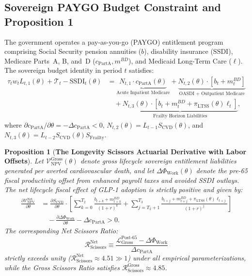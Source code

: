 \documentclass[11pt,a4paper]{article}
\newtheorem{proposition}{Proposition}
\begin{document}
\subsection{Sovereign PAYGO Budget Constraint and Proposition 1}
The government operates a pay-as-you-go (PAYGO) entitlement program comprising Social Security pension annuities ($b$), disability insurance ($\text{SSDI}$), Medicare Parts~A, B, and~D ($c_{\text{PartA}}, m^{BD}$), and Medicaid Long-Term Care ($\ell$). The sovereign budget identity in period $t$ satisfies:
\begin{equation}
\begin{aligned}
    \tau_t w_t L_{t, 1}(\theta) + \mathcal{T}_t - \text{SSDI}_t(\theta) &= \underbrace{N_{t, 1} \cdot c_{\text{PartA}}(\theta)}_{\text{Acute Inpatient Medicare}} + \underbrace{N_{t, 2}(\theta) \cdot \left[ b_t + m_t^{BD} \right]}_{\text{OASDI + Outpatient Medicare}} \\
    &\quad + \underbrace{N_{t, 3}(\theta) \cdot \left[ b_t + m_t^{BD} + \pi_{\text{LTSS}}(\theta)\ell_t \right]}_{\text{Frailty Horizon Liabilities}},
\end{aligned}
\end{equation}
where $\partial c_{\text{PartA}}/\partial \theta = -\Delta c_{\text{PartA}} < 0$, $N_{t, 2}(\theta) = L_{t-1} S_{\text{CVD}}(\theta)$, and $N_{t, 3}(\theta) = L_{t-2} S_{\text{CVD}}(\theta) S_{\text{Frailty}}$.

\begin{proposition}[\textbf{The Longevity Scissors Actuarial Derivative with Labor Offsets}]
\label{prop:scissors}
Let $\mathcal{V}_{\text{NPV}}^{\text{Gross}}(\theta)$ denote gross lifecycle sovereign entitlement liabilities generated per averted cardiovascular death, and let $\Delta\Phi_{\text{Work}}(\theta)$ denote the pre-65 fiscal productivity offset from enhanced payroll taxes and avoided SSDI outlays. The net lifecycle fiscal effect of GLP-1 adoption is strictly positive and given by:
\begin{equation}
\begin{aligned}
    \frac{\partial \mathcal{V}_{\text{NPV}}^{\text{Net}}}{\partial \theta} &= \frac{\partial S_{\text{CVD}}}{\partial \theta} \cdot \left[ \sum_{k=0}^{T_2} \frac{b_{t+k} + m_{t+k}^{BD}}{(1+r)^k} + \sum_{j=T_2+1}^{T_3} \frac{b_{t+j} + m_{t+j}^{BD} + \pi_{\text{LTSS}}(\theta)\ell_{t+j}}{(1+r)^j} \right] \\
    &\quad - \frac{\partial \Delta\Phi_{\text{Work}}}{\partial \theta} - \Delta c_{\text{PartA}} > 0.
\end{aligned}
\end{equation}
The corresponding Net Scissors Ratio:
\begin{equation}
    \mathcal{R}_{\text{Scissors}}^{\text{Net}} \equiv \frac{\mathcal{L}_{\text{Gross}}^{\text{Post-65}} - \Delta\Phi_{\text{Work}}}{\Delta c_{\text{PartA}}}
\end{equation}
strictly exceeds unity ($\mathcal{R}_{\text{Scissors}}^{\text{Net}} \approx 4.51 \gg 1$) under all empirical parameterizations, while the Gross Scissors Ratio satisfies $\mathcal{R}_{\text{Scissors}}^{\text{Gross}} \approx 4.85$.
\end{proposition}
\end{document}

